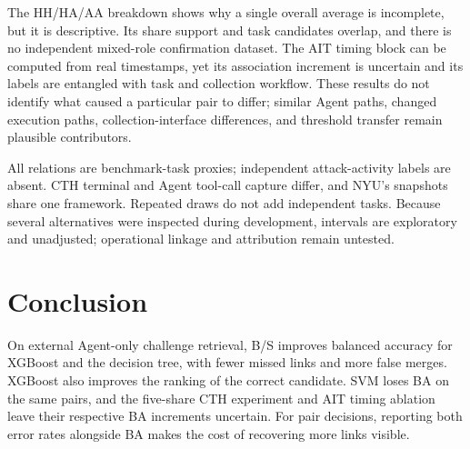 \documentclass[10pt]{article}
\begin{document}
The HH/HA/AA breakdown shows why a single overall average is incomplete, but it is descriptive. Its share support and task candidates overlap, and there is no independent mixed-role confirmation dataset. The AIT timing block can be computed from real timestamps, yet its association increment is uncertain and its labels are entangled with task and collection workflow. These results do not identify what caused a particular pair to differ; similar Agent paths, changed execution paths, collection-interface differences, and threshold transfer remain plausible contributors.

All relations are benchmark-task proxies; independent attack-activity labels are absent. CTH terminal and Agent tool-call capture differ, and NYU's snapshots share one framework. Repeated draws do not add independent tasks. Because several alternatives were inspected during development, intervals are exploratory and unadjusted; operational linkage and attribution remain untested.

\section{Conclusion}
On external Agent-only challenge retrieval, B/S improves balanced accuracy for XGBoost and the decision tree, with fewer missed links and more false merges. XGBoost also improves the ranking of the correct candidate. SVM loses BA on the same pairs, and the five-share CTH experiment and AIT timing ablation leave their respective BA increments uncertain. For pair decisions, reporting both error rates alongside BA makes the cost of recovering more links visible.
\end{document}
